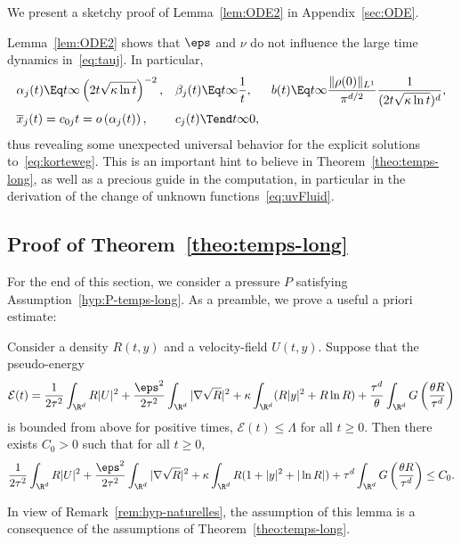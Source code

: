 We present a sketchy proof of Lemma~\ref{lem:ODE2} in Appendix~\ref{sec:ODE}.

Lemma~\ref{lem:ODE2} shows that $\eps$ and $\nu$ do not influence the large time dynamics in~\eqref{eq:tauj}. In particular,
\[
\begin{aligned}
&\alpha_j(t)\Eq t \infty \left(2t\sqrt{\kappa \ln t}\right)^{-2},&&
\beta_j(t)\Eq t \infty \frac{1}{t}, && b(t)\Eq t \infty \frac{\|\rho(0)\|_{L^1}}{\pi^{d/2}}\frac{1}{(2t\sqrt{\kappa \ln t})^{d}},\\
& \overline x_j(t)=c_{0j}t=o\left(\alpha_j(t)\right),&& c_j(t)\Tend t \infty 0,
\end{aligned}
\]
thus revealing some unexpected universal behavior for the explicit solutions to~\eqref{eq:korteweg}. This is an important hint to believe in Theorem~\ref{theo:temps-long}, as well as a precious guide in the computation, in particular in the derivation of the change of unknown functions~\eqref{eq:uvFluid}.


\subsection{Proof of Theorem~\ref{theo:temps-long}}\label{sec:convergence}

For the end of this section, we consider a pressure $P$ satisfying Assumption~\ref{hyp:P-temps-long}. As a preamble, we prove a useful a priori estimate:

\begin{lemm}\label{lem:aprioriE}
Consider a density $R(t,y)$ and a velocity-field $U(t,y).$ Suppose that the pseudo-energy
\begin{equation*}
\mathcal E(t) = \frac{1}{2\tau^2}\int_{\R^d} R|U|^2+\frac{\eps^2}{2\tau^2} \int_{\R^d}|\nabla \sqrt R|^2 +\kappa\int_{\R^d} (R|y|^2 + R \ln R) +
\frac{\tau^d}{\theta}\int_{\R^d} G\left(\frac{ \theta R}{\tau^d}\right)
\end{equation*}
is bounded from above for positive times, $\mathcal E(t)\le
\Lambda$ for all $t\ge 0$. Then there exists $C_0>0$ such that for all $t\ge 0$,
\begin{equation*}
\frac{1}{2\tau^2}\int_{\R^d} R|U|^2 +\frac{\eps^2}{2\tau^2} \int_{\R^d}|\nabla \sqrt R|^2 + \kappa \int_{\R^d} R (1+|y|^2 + |\ln R|) +
\tau^d\int_{\R^d} G\left(\frac{ \theta R}{\tau^d}\right)
\le C_0.
\end{equation*}
\end{lemm}

In view of Remark~\ref{rem:hyp-naturelles}, the assumption of this lemma is a consequence of the assumptions of Theorem~\ref{theo:temps-long}.

